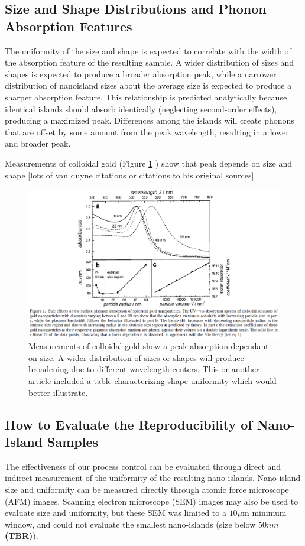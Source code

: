 \documentclass[12pt,oneside,english]{article}
\begin{document}
	\subsection{Size and Shape Distributions and Phonon Absorption Features}
	The uniformity of the size and shape is expected to correlate with the width of the absorption feature of the resulting sample.
	A wider distribution of sizes and shapes is expected to produce a broader absorption peak, while a narrower distribution of nanoisland sizes about the average size is expected to produce a sharper absorption feature.
	This relationship is predicted analytically because identical islands should absorb identically (neglecting second-order effects), producing a maximized peak.  
	Differences among the islands will create phonons that are offset by some amount from the peak wavelength, resulting in a lower and broader peak.

	Measurements of colloidal gold (Figure \ref{f:link99} \cite{link99}) show that peak depends on size and shape [lots of van duyne citations or citations to his original sources].
	
	\begin{figure}
		\includegraphics[width=150mm]{images/link99.eps}
		\caption{Measurements of colloidal gold show a peak absorption dependant on size.  A wider distribution of sizes or shapes will produce broadening due to different wavelength centers.  This or another article included a table characterizing shape uniformity which would better illustrate.}
		\label{f:link99}
	\end{figure}
		

	\subsection{How to Evaluate the Reproducibility of Nano-Island Samples}
	The effectiveness of our process control can be evaluated through direct and indirect measurement of the uniformity of the resulting nano-islands.  
	Nano-island size and uniformity can be measured directly through atomic force microscope (AFM) images.  
	Scanning electron microscope (SEM) images may also be used to evaluate size and uniformity, but these SEM was limited to a $10\mu$m minimum window, and could not evaluate the smallest nano-islands (size below {\bf $50nm$ (TBR)}).  
	
\end{document}
